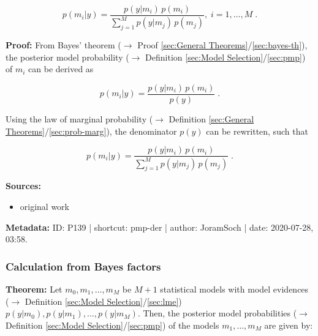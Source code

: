 \documentclass[a4paper,12pt,twoside]{book}
\begin{document}
\begin{equation} \label{eq:pmp-der-PMP}
p(m_i|y) = \frac{p(y|m_i) \, p(m_i)}{\sum_{j=1}^{M} p(y|m_j) \, p(m_j)}, \; i = 1, \ldots, M \; .
\end{equation}


\vspace{1em}
\textbf{Proof:} From Bayes' theorem ($\rightarrow$ Proof \ref{sec:General Theorems}/\ref{sec:bayes-th}), the posterior model probability ($\rightarrow$ Definition \ref{sec:Model Selection}/\ref{sec:pmp}) of $m_i$ can be derived as

\begin{equation} \label{eq:pmp-der-PMP-s1}
p(m_i|y) = \frac{p(y|m_i) \, p(m_i)}{p(y)} \; .
\end{equation}

Using the law of marginal probability ($\rightarrow$ Definition \ref{sec:General Theorems}/\ref{sec:prob-marg}), the denominator $p(y)$ can be rewritten, such that

\begin{equation} \label{eq:pmp-der-PMP-s2}
p(m_i|y) = \frac{p(y|m_i) \, p(m_i)}{\sum_{j=1}^{M} p(y|m_j) \, p(m_j)} \; .
\end{equation}


\vspace{1em}
\textbf{Sources:}
\begin{itemize}
\item original work\end{itemize}


\vspace{1em}
\textbf{Metadata:} ID: P139 | shortcut: pmp-der | author: JoramSoch | date: 2020-07-28, 03:58.
\vspace{1em}



\subsubsection[\textbf{Calculation from Bayes factors}]{Calculation from Bayes factors} \label{sec:pmp-bf}
\setcounter{equation}{0}

\textbf{Theorem:} Let $m_0, m_1, \ldots, m_M$ be $M+1$ statistical models with model evidences ($\rightarrow$ Definition \ref{sec:Model Selection}/\ref{sec:lme}) $p(y \vert m_0), p(y \vert m_1), \ldots, p(y \vert m_M)$. Then, the posterior model probabilities ($\rightarrow$ Definition \ref{sec:Model Selection}/\ref{sec:pmp}) of the models $m_1, \ldots, m_M$ are given by:
\end{document}
